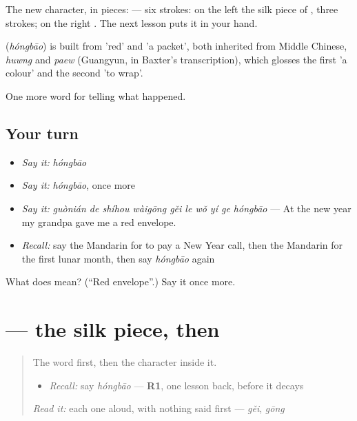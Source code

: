 The new character, in pieces:  — six strokes: on the left the silk piece of , three strokes; on the right . The next lesson puts it in your hand.

\begin{cousinweb}
\textbf{} (\emph{hóngbāo}) is built from  'red' and  'a packet', both inherited from Middle Chinese, \emph{huwng} and \emph{paew} (Guangyun, in Baxter's transcription), which glosses the first 'a colour' and the second 'to wrap'.
\end{cousinweb}

\begin{grammarlens}[title={What you've built}]
One more word for telling what happened.
\end{grammarlens}

\subsection*{Your turn}
\begin{itemize}
\raggedright
  \item \emph{Say it:} \emph{hóngbāo}
  \item \emph{Say it:} \emph{hóngbāo}, once more
  \item \emph{Say it:} \emph{guònián de shíhou wàigōng gěi le wǒ yí ge hóngbāo} — At the new year my grandpa gave me a red envelope.
  \item \emph{Recall:} say the Mandarin for to pay a New Year call, then the Mandarin for the first lunar month, then say \emph{hóngbāo} again
\end{itemize}

\begin{tcolorbox}[breakable,colback=teal!4,colframe=teal!35!black,title={Before you move on}]
What does  mean? (\textquotedblleft{}Red envelope\textquotedblright{}.) Say it once more.
\end{tcolorbox}
\section[\texorpdfstring{\zh{红} (hóng)}{红 (hóng)}]{ — the silk piece, then }

\label{lesson:ZH-W334-hong-red}



\begin{quote}
The word first, then the character inside it.

\begin{itemize}
\raggedright
  \item \emph{Recall:} say \emph{hóngbāo} — \textbf{R1}, one lesson back, before it decays
\end{itemize}

\begin{quote}
 
\end{quote}

\emph{Read it:} each one aloud, with nothing said first — \emph{gěi}, \emph{gōng}
\end{quote}

